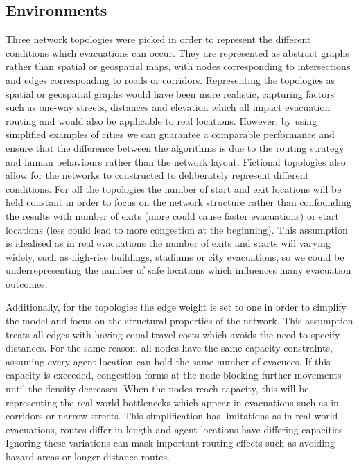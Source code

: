 \documentclass[12pt,a4paper]{report}
\begin{document}
\subsection{Environments}
Three network topologies were picked in order to represent the different conditions which evacuations can occur. They are represented as abstract graphs rather than spatial or geospatial maps, with nodes corresponding to intersections and edges corresponding to roads or corridors. Representing the topologies as spatial or geospatial graphs would have been more realistic, capturing factors such as one-way streets, distances and elevation which all impact evacuation routing and would also be applicable to real locations. However, by using simplified examples of cities we can guarantee a comparable performance and ensure that the difference between the algorithms is due to the routing strategy and human behaviours rather than the network layout. Fictional topologies also allow for the networks to constructed to deliberately represent different conditions.
For all the topologies the number of start and exit locations will be held constant in order to focus on the network structure rather than confounding the results with number of exits (more could cause faster evacuations) or start locations (less could lead to more congestion at the beginning). This assumption is idealised as in real evacuations the number of exits and starts will varying widely, such as high-rise buildings, stadiums or city evacuations, so we could be underrepresenting the number of safe locations which influences many evacuation outcomes.

Additionally, for the topologies the edge weight is set to one in order to simplify the model and focus on the structural properties of the network. This assumption treats all edges with having equal travel costs which avoids the need to specify distances. For the same reason, all nodes have the same capacity constraints, assuming every agent location can hold the same number of evacuees. If this capacity is exceeded, congestion forms at the node blocking further movements until the density decreases. When the nodes reach capacity, this will be representing the real-world bottlenecks which appear in evacuations such as in corridors or narrow streets. This simplification has limitations as in real world evacuations, routes differ in length and agent locations have differing capacities. Ignoring these variations can mask important routing effects such as avoiding hazard areas or longer distance routes.
\end{document}
